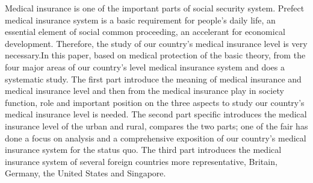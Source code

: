 
{ %

Medical insurance is one of the important parts of social security system. Prefect medical insurance system is a basic requirement for people’s daily life, an essential element of social common proceeding, an accelerant for economical development. Therefore, the study of our country’s medical insurance level is very necessary.In this paper, based on medical protection of the basic theory, from the four major areas of our country’s level medical insurance system and does a systematic study. The first part introduce the meaning of medical insurance and medical insurance level and then from the medical insurance play in society function, role and important position on the three aspects to study our country's medical insurance level is needed. The second part specific introduces the medical insurance level of the urban and rural, compares the two parts; one of the fair has done a focus on analysis and a comprehensive exposition of our country's medical insurance system for the status quo. The third part introduces the medical insurance system of several foreign countries more representative, Britain, Germany, the United States and Singapore.

} 